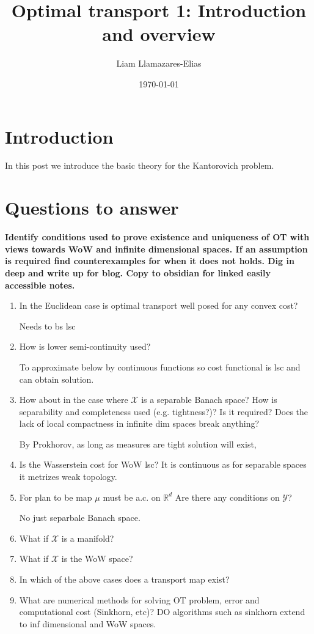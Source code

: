 \documentclass[
    a4paper,
    DIV=14,
    abstract=true,
    numbers=noenddot
]
{scrartcl}
\theoremstyle{definition}
\newcommand{\R}{\mathbb{R}}
\newcommand{\Xx}{\mathcal{X}}
\newcommand{\Yy}{\mathcal{Y}}
\begin{document}
\title{Optimal transport 1: Introduction and overview}
\author{Liam Llamazares-Elias}
\date{\today}
\maketitle
\section{Introduction}
In this post we introduce the basic theory for the Kantorovich problem.
\section{Questions to answer}
\textbf{Identify conditions used to prove existence and uniqueness of OT with views towards WoW and infinite dimensional spaces. If an assumption is required find counterexamples for when it does not holds. Dig in deep and write up for blog. Copy to obsidian for linked easily accessible notes.}
\begin{enumerate}
    \item In the Euclidean case is optimal transport well posed for any convex cost?
    
    Needs to bs lsc
    \item How is lower semi-continuity used?
    
    To approximate below by continuous functions so cost functional is  lsc and can obtain solution.
    \item How about in the case where $\Xx $ is a separable Banach space? How is separability and completeness used (e.g. tightness?)? Is it required? Does the lack of local compactness in infinite dim spaces break anything?
    
    By Prokhorov, as long as measures are tight solution will exist,

    \item Is the Wasserstein cost for WoW lsc?
    It is continuous as for separable spaces it metrizes weak topology.

    \item For plan to be map $\mu $ must be a.c. on $\R^d$   Are there any conditions on $\Yy $?
    
    No just separbale Banach space.


    \item What if $\Xx $ is a  manifold?
    \item What if $\Xx $ is the WoW space?
    \item In which of the above cases does a transport map exist?
    \item What are numerical methods for solving OT problem, error and computational cost (Sinkhorn, etc)? DO algorithms such as sinkhorn extend to inf dimensional and WoW spaces.
\end{enumerate}
\end{document}
